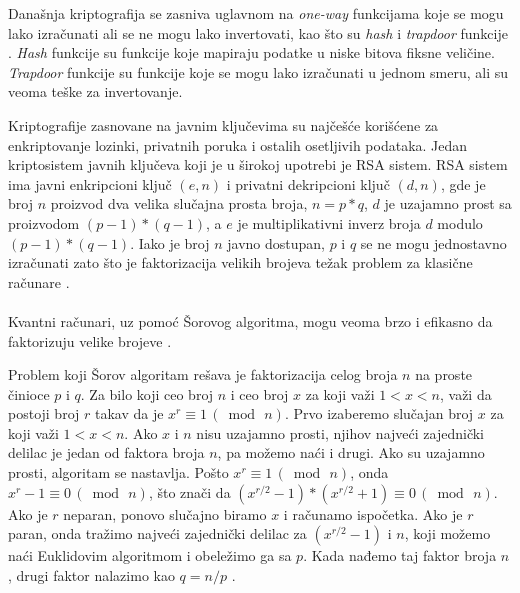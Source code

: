 \documentclass[fleqn, 12pt]{article}
\begin{document}
\begin{text}
Današnja kriptografija se zasniva uglavnom na \textit{one-way} funkcijama koje se mogu lako izračunati ali se ne mogu lako invertovati, kao što su \textit{hash} i \textit{trapdoor} funkcije \cite{G5}. \textit{Hash} funkcije su funkcije koje mapiraju podatke u niske bitova fiksne veličine. \textit{Trapdoor} funkcije su funkcije koje se mogu lako izračunati u jednom smeru, ali su veoma teške za invertovanje.

Kriptografije zasnovane na javnim ključevima su najčešće korišćene za enkriptovanje lozinki, privatnih poruka i ostalih osetljivih podataka. Jedan kriptosistem javnih ključeva koji je u širokoj upotrebi je RSA sistem. RSA sistem ima javni enkripcioni ključ \((e,n)\) i privatni dekripcioni ključ \((d,n)\), gde je broj \(n\) proizvod dva velika slučajna prosta broja, \(n = p * q\), \(d\) je uzajamno prost sa proizvodom \((p - 1) * (q - 1)\), a \(e\) je multiplikativni inverz broja \(d\) modulo \((p - 1) * (q - 1)\). Iako je broj \(n\) javno dostupan, \(p\) i \(q\) se ne mogu jednostavno izračunati zato što je faktorizacija velikih brojeva težak problem za klasične računare \cite{G3}.
\\\\

Kvantni računari, uz pomoć Šorovog algoritma, mogu veoma brzo i efikasno da faktorizuju velike brojeve \cite{G4}.

Problem koji Šorov algoritam rešava je faktorizacija celog broja \(n\) na proste činioce \(p\) i \(q\). Za bilo koji ceo broj \(n\) i ceo broj \(x\) za koji važi \(1 < x < n\), važi da postoji broj \(r\) takav da je \(x^r \equiv 1\, ( \bmod\, n)\). Prvo izaberemo slučajan broj \(x\) za koji važi \(1 < x < n\). Ako \(x\) i \(n\) nisu uzajamno prosti, njihov najveći zajednički delilac je jedan od faktora broja \(n\), pa možemo naći i drugi. Ako su uzajamno prosti, algoritam se nastavlja.
Pošto  \(x^r \equiv 1\, ( \bmod\, n)\), onda \(x^r - 1 \equiv 0\, ( \bmod\, n)\), što znači da \((x^{r/2} - 1)*(x^{r/2} + 1) \equiv 0\, ( \bmod\, n)\). Ako je \(r\) neparan, ponovo slučajno biramo \(x\) i računamo ispočetka. Ako je \(r\) paran, onda tražimo najveći zajednički delilac za \((x^{r/2} - 1)\) i \(n\), koji možemo naći Euklidovim algoritmom i obeležimo ga sa \(p\).
Kada nađemo taj faktor broja \(n\), drugi faktor nalazimo kao \(q = n/p\) \cite{G4}.

\end{text}

\newpage
\end{document}
